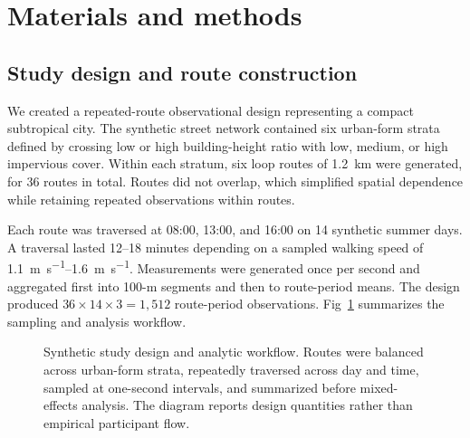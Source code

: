 \section{Materials and methods}

\subsection{Study design and route construction}
We created a repeated-route observational design representing a compact subtropical city. The synthetic street network contained six urban-form strata defined by crossing low or high building-height ratio with low, medium, or high impervious cover. Within each stratum, six loop routes of \SI{1.2}{km} were generated, for 36 routes in total. Routes did not overlap, which simplified spatial dependence while retaining repeated observations within routes.

Each route was traversed at 08:00, 13:00, and 16:00 on 14 synthetic summer days. A traversal lasted 12--18 minutes depending on a sampled walking speed of \SIrange{1.1}{1.6}{m.s^{-1}}. Measurements were generated once per second and aggregated first into 100-m segments and then to route-period means. The design produced $36\times14\times3=1{,}512$ route-period observations. Fig~\ref{fig:design} summarizes the sampling and analysis workflow.

\begin{figure}[htbp]
\centering
{}
\caption{Synthetic study design and analytic workflow. Routes were balanced across urban-form strata, repeatedly traversed across day and time, sampled at one-second intervals, and summarized before mixed-effects analysis. The diagram reports design quantities rather than empirical participant flow.}
\label{fig:design}
\end{figure}

